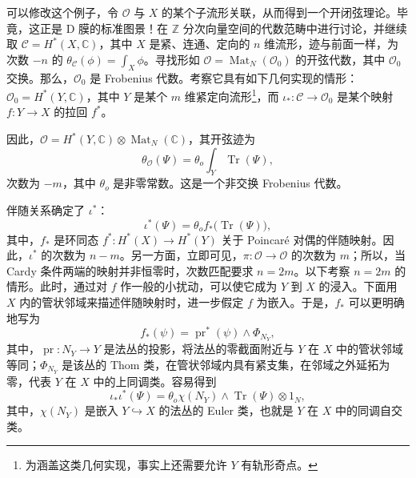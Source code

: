 可以修改这个例子，令 $\mathcal{O}$ 与 $X$ 的某个子流形关联，从而得到一个开闭弦理论。毕竟，这正是 D 膜的标准图景！在 $\mathbb{Z}$ 分次向量空间的代数范畴中进行讨论，并继续取 $\mathcal{C}=H^*(X,\mathbb{C})$，其中 $X$ 是紧、连通、定向的 $n$ 维流形，迹与前面一样，为次数 $-n$ 的 $\theta_{\mathcal{C}}(\phi)=\int_X\phi$。寻找形如 $\mathcal{O}=\operatorname{Mat}_N(\mathcal{O}_0)$ 的开弦代数，其中 $\mathcal{O}_0$ 交换。那么，$\mathcal{O}_0$ 是 Frobenius 代数。考察它具有如下几何实现的情形：$\mathcal{O}_0=H^*(Y,\mathbb{C})$，其中 $Y$ 是某个 $m$ 维紧定向流形\footnote{为涵盖这类几何实现，事实上还需要允许 $Y$ 有轨形奇点。}，而 $\iota_*\colon\mathcal{C}\to\mathcal{O}_0$ 是某个映射 $f\colon Y\to X$ 的拉回 $f^*$。

因此，$\mathcal{O}=H^*(Y,\mathbb{C})\otimes\operatorname{Mat}_N(\mathbb{C})$，其开弦迹为
\begin{equation}\label{eq:2.69}
\theta_{\mathcal{O}}(\Psi)=\theta_o\int_Y\operatorname{Tr}(\Psi),
\end{equation}
次数为 $-m$，其中 $\theta_o$ 是非零常数。这是一个非交换 Frobenius 代数。

伴随关系确定了 $\iota^*$：
\begin{equation}\label{eq:2.70}
\iota^*(\Psi)=\theta_o f_*\bigl(\operatorname{Tr}(\Psi)\bigr),
\end{equation}
其中，$f_*$ 是环同态 $f^*\colon H^*(X)\to H^*(Y)$ 关于 Poincaré 对偶的伴随映射。因此，$\iota^*$ 的次数为 $n-m$。另一方面，立即可见，$\pi\colon\mathcal{O}\to\mathcal{O}$ 的次数为 $m$；所以，当 Cardy 条件两端的映射并非恒零时，次数匹配要求 $n=2m$。以下考察 $n=2m$ 的情形。此时，通过对 $f$ 作一般的小扰动，可以使它成为 $Y$ 到 $X$ 的浸入。下面用 $X$ 内的管状邻域来描述伴随映射时，进一步假定 $f$ 为嵌入。于是，$f_*$ 可以更明确地写为
\begin{equation}\label{eq:2.71}
f_*(\psi)=\operatorname{pr}^*(\psi)\wedge\Phi_{N_Y},
\end{equation}
其中，$\operatorname{pr}\colon N_Y\to Y$ 是法丛的投影，将法丛的零截面附近与 $Y$ 在 $X$ 中的管状邻域等同；$\Phi_{N_Y}$ 是该丛的 Thom 类，在管状邻域内具有紧支集，在邻域之外延拓为零，代表 $Y$ 在 $X$ 中的上同调类。容易得到
\begin{equation}\label{eq:2.72}
\iota_*\iota^*(\Psi)=\theta_o\chi(N_Y)\wedge\operatorname{Tr}(\Psi)\otimes1_N,
\end{equation}
其中，$\chi(N_Y)$ 是嵌入 $Y\hookrightarrow X$ 的法丛的 Euler 类，也就是 $Y$ 在 $X$ 中的同调自交类。

